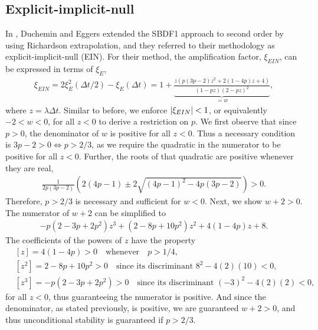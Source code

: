 \subsection{Explicit-implicit-null}
\label{sect:ein}
In \cite{duchemin2014explicit}, Duchemin and Eggers extended the SBDF1 approach to second order by using Richardson extrapolation, and they referred to their methodology as explicit-implicit-null (EIN). For their method, the amplification factor, $\xi_{EIN}$, can be expressed in terms of $\xi_E$, 
\begin{align}
\xi_{EIN} 
= 2\xi^2_{E}(\Delta t/2) - \xi_E(\Delta t) 
= 1 + \underbrace{\frac{z\left(p(3p-2)z^2 + 2(1-4p)z + 4 \right)}{(1 - pz)(2-pz)^2}}_{=w},
\label{ein amp fac}
\end{align} 
where $z = \lambda\Delta t$. Similar to before, we enforce $\left|\xi_{EIN}\right|<1$, or equivalently $-2<w<0$, for all $z<0$ to derive a restriction on $p$. We first observe that since $p>0$, the denominator of $w$ is positive for all $z<0$. Thus a necessary condition is $3p-2 > 0 \iff p>2/3$, as we require the quadratic in the numerator to be positive for all $z<0$. Further, the roots of that quadratic are positive whenever they are real,
\begin{align}
\frac{1}{2p(3p-2)}\left(2(4p-1) \pm  2\sqrt{(4p-1)^2 - 4p(3p-2)}\right) > 0.
\end{align} 
Therefore, $p>2/3$ is necessary and sufficient for $w<0$. Next, we show $w+2>0$. The numerator of $w+2$ can be simplified to 
\begin{align}
-p(2-3p+2p^2) z^3 + (2-8p+10p^2)z^2 + 4(1-4p)z + 8.
\end{align}
The coefficients of the powers of $z$ have the property
\begin{align*}
& [z] = 4(1-4p) > 0 \quad\text{whenever}\quad p > 1/4,
\\
&[z^2] = 2-8p + 10p^2 > 0 \quad\text{since its discriminant } 8^2 - 4(2)(10) < 0,
\\
&[z^3] = -p(2-3p+2p^2) > 0 \quad\text{since its discriminant } (-3)^2 - 4(2)(2) < 0,
\end{align*}
for all $z<0$, thus guaranteeing the numerator is positive. And since the denominator, as stated previously, is positive, we are guaranteed $w+2>0$, and thus unconditional stability is guaranteed if $p>2/3$.

